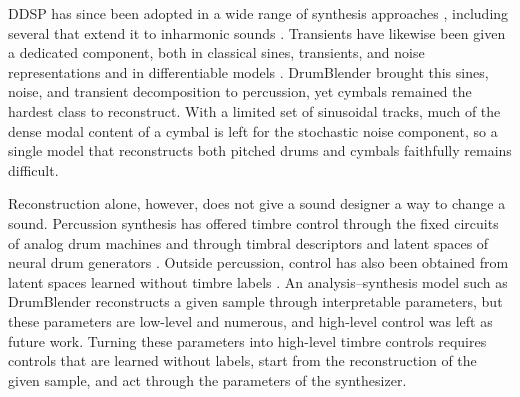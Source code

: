 DDSP has since been adopted in a wide range of synthesis approaches \citep{hayes2024review,shan2022differentiable,caspe2022ddx7,barahonarios2024noisebandnet}, including several that extend it to inharmonic sounds \citep{renault2023ddsp,diaz2023rigid,hayes2023sinusoidal}.
Transients have likewise been given a dedicated component, both in classical sines, transients, and noise representations \citep{levine1998sines,verma2000extending} and in differentiable models \citep{liu2024ddspsfx,simionato2025sines}.
DrumBlender \citep{shier2023differentiable} brought this sines, noise, and transient decomposition to percussion, yet cymbals remained the hardest class to reconstruct.
With a limited set of sinusoidal tracks, much of the dense modal content of a cymbal is left for the stochastic noise component, so a single model that reconstructs both pitched drums and cymbals faithfully remains difficult.

Reconstruction alone, however, does not give a sound designer a way to change a sound.
Percussion synthesis has offered timbre control through the fixed circuits of analog drum machines \citep{werner2014physically,werner2014tr808} and through timbral descriptors and latent spaces of neural drum generators \citep{aouameur2019neural,ramires2020neural,nistal2020drumgan,lavault2022stylewavegan}.
Outside percussion, control has also been obtained from latent spaces learned without timbre labels \citep{caillon2021rave,kotowski2026plaud,paek2025learning}.
An analysis--synthesis model such as DrumBlender \citep{shier2023differentiable} reconstructs a given sample through interpretable parameters, but these parameters are low-level and numerous, and high-level control was left as future work.
Turning these parameters into high-level timbre controls requires controls that are learned without labels, start from the reconstruction of the given sample, and act through the parameters of the synthesizer.

